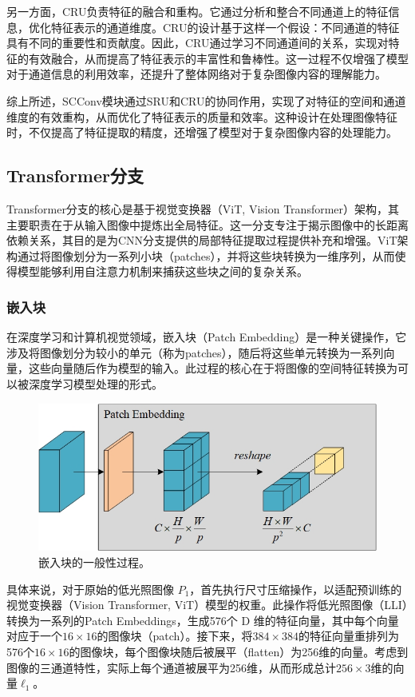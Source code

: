 \documentclass[a4paper]{ctexart}
\begin{document}
另一方面，CRU负责特征的融合和重构。它通过分析和整合不同通道上的特征信息，优化特征表示的通道维度。CRU的设计基于这样一个假设：不同通道的特征具有不同的重要性和贡献度。因此，CRU通过学习不同通道间的关系，实现对特征的有效融合，从而提高了特征表示的丰富性和鲁棒性。这一过程不仅增强了模型对于通道信息的利用效率，还提升了整体网络对于复杂图像内容的理解能力。

综上所述，SCConv模块通过SRU和CRU的协同作用，实现了对特征的空间和通道维度的有效重构，从而优化了特征表示的质量和效率。这种设计在处理图像特征时，不仅提高了特征提取的精度，还增强了模型对于复杂图像内容的处理能力。
	
\subsection{Transformer分支}
	
Transformer分支的核心是基于视觉变换器（ViT, Vision Transformer）架构，其主要职责在于从输入图像中提炼出全局特征。这一分支专注于揭示图像中的长距离依赖关系，其目的是为CNN分支提供的局部特征提取过程提供补充和增强。ViT架构通过将图像划分为一系列小块（patches），并将这些块转换为一维序列，从而使得模型能够利用自注意力机制来捕获这些块之间的复杂关系。
	
\subsubsection{嵌入块}
	
在深度学习和计算机视觉领域，嵌入块（Patch Embedding）是一种关键操作，它涉及将图像划分为较小的单元（称为patches），随后将这些单元转换为一系列向量，这些向量随后作为模型的输入。此过程的核心在于将图像的空间特征转换为可以被深度学习模型处理的形式。
	
\begin{figure}[htb]
	\centering 
	\includegraphics[width=0.5\columnwidth]{picture/LLIE/My Architecture/Patch Embedding}
	\caption{
		\label{fig: Patch Embedding} 
		嵌入块的一般性过程。
	}
\end{figure}
	
具体来说，对于原始的低光照图像 $P_1$，首先执行尺寸压缩操作，以适配预训练的视觉变换器（Vision Transformer, ViT）模型的权重。此操作将低光照图像（LLI）转换为一系列的Patch Embeddings，生成576个 D 维的特征向量，其中每个向量对应于一个$16 \times 16$的图像块（patch）。接下来，将$384 \times 384$的特征向量重排列为576个$16\times16$的图像块，每个图像块随后被展平（flatten）为256维的向量。考虑到图像的三通道特性，实际上每个通道被展平为256维，从而形成总计$256 \times 3$维的向量$\ell_1$。
\end{document}
